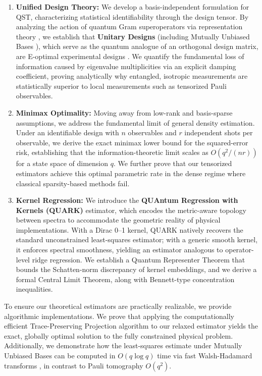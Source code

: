 \documentclass[noinfoline]{imsart}\setcounter{tocdepth}{2}
\theoremstyle{plain}
\begin{document}
\begin{enumerate}[leftmargin = *]
\item \textbf{Unified Design Theory:} We develop a basis-independent formulation for QST, characterizing statistical identifiability through the design tensor. By analyzing the action of quantum Gram superoperators via representation theory \cite{faraut2008analysis}, we establish that \textbf{Unitary Designs} (including Mutually Unbiased Bases \cite{klappenecker2005mutually}), which serve as the quantum analogue of an orthogonal design matrix, are E-optimal experimental designs \cite{pukelsheim2006optimal}. We quantify the fundamental loss of information caused by eigenvalue multiplicities via an explicit damping coefficient, proving analytically why entangled, isotropic measurements are statistically superior to local measurements such as tensorized Pauli observables.

\item \textbf{Minimax Optimality:} Moving away from low-rank and basis-sparse assumptions, we address the fundamental limit of general density estimation. Under an identifiable design with $n$ observables and $r$ independent shots per observable, we derive the exact minimax lower bound for the squared-error risk, establishing that the information-theoretic limit scales as $O(q^{2}/(nr))$ for a state space of dimension $q$. We further prove that our tensorized estimators achieve this optimal parametric rate in the dense regime where classical sparsity-based methods fail.

\item \textbf{Kernel Regression:} We introduce the \textbf{QUAntum Regression with Kernels (QUARK)} estimator, which encodes the metric-aware topology between spectra to accommodate the geometric reality of physical implementations. With a Dirac 0--1 kernel, QUARK natively recovers the standard unconstrained least-squares estimator; with a generic smooth kernel, it enforces spectral smoothness, yielding an estimator analogous to operator-level ridge regression. We establish a Quantum Representer Theorem that bounds the Schatten-norm discrepancy of kernel embeddings, and we derive a formal Central Limit Theorem, along with Bennett-type concentration inequalities.
\end{enumerate}

To ensure our theoretical estimators are practically realizable, we provide algorithmic implementations. We prove that applying the computationally efficient Trace-Preserving Projection algorithm \cite{smolin2012efficient} to our relaxed estimator yields the exact, globally optimal solution to the fully constrained physical problem. Additionally, we demonstrate how the least-squares estimate under Mutually Unbiased Bases can be computed in $O(q \log q)$ time via fast Walsh-Hadamard transforms \cite{fino1976unified}, in contrast to Pauli tomography $O(q^{2})$.
\end{document}
